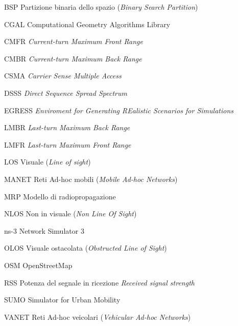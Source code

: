 \begin{abbreviations}

\item[BSP] Partizione binaria dello spazio (\textit{Binary Search Partition})
\item[CGAL] Computational Geometry Algorithms Library
\item[CMFR] \textit{Current-turn Maximum Front Range}
\item[CMBR] \textit{Current-turn Maximum Back Range}
\item[CSMA] \textit{Carrier Sense Multiple Access}
\item[DSSS] \textit{Direct Sequence Spread Spectrum}
\item[EGRESS] \textit{Enviroment for Generating REalistic Scenarios for Simulations}
\item[LMBR] \textit{Last-turn Maximum Back Range}
\item[LMFR] \textit{Last-turn Maximum Front Range}
\item[LOS] Visuale (\textit{Line of sight})
\item[MANET] Reti Ad-hoc mobili (\textit{Mobile Ad-hoc Networks})
\item[MRP] Modello di radiopropagazione
\item[NLOS] Non in visuale (\textit{Non Line Of Sight})
\item[ns-3] Network Simulator 3
\item[OLOS] Visuale ostacolata (\textit{Obstructed Line of Sight})
\item[OSM] OpenStreetMap
\item[RSS] Potenza del segnale in ricezione \textit{Received signal strength}
\item[SUMO] Simulator for Urban Mobility
\item[VANET] Reti Ad-hoc veicolari (\textit{Vehicular Ad-hoc Networks})

\end{abbreviations}
